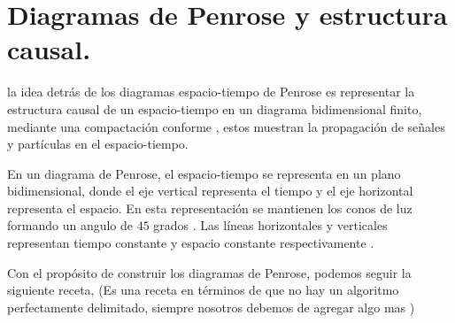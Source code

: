 \section{Diagramas de Penrose y estructura causal.}
la idea detrás de los diagramas espacio-tiempo  de Penrose es representar la estructura causal de un espacio-tiempo en un diagrama bidimensional finito, mediante una compactación conforme , estos muestran la propagación de señales y partículas en el espacio-tiempo.

En un diagrama de Penrose, el espacio-tiempo se representa en un plano bidimensional, donde el eje vertical representa el tiempo y el eje horizontal representa el espacio. En esta representación se mantienen los conos de luz formando un angulo de $45$ grados . Las líneas horizontales y verticales representan  tiempo constante y espacio constante respectivamente .


Con el propósito de construir los diagramas de Penrose, podemos seguir la siguiente receta,
(Es una receta en términos de que no hay un algoritmo perfectamente delimitado, siempre nosotros debemos de agregar algo mas )


